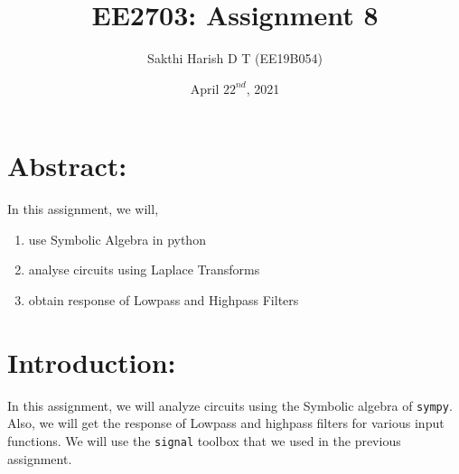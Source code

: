 \documentclass[11pt, a4paper]{article}
\title{EE2703: Assignment 8}
\author{Sakthi Harish D T (EE19B054)}
\date{April $22^{nd}$, 2021}
\begin{document}
\maketitle
\section{Abstract:}
In this assignment, we will,
\begin{enumerate}
    \item use Symbolic Algebra in python
    \item analyse circuits using Laplace Transforms
    \item obtain response of Lowpass and Highpass Filters 
\end{enumerate}
\section{Introduction:}
In this assignment, we will analyze circuits using the Symbolic algebra  of \texttt{sympy}. Also, we will get the response of Lowpass and highpass filters for various input functions. We will use the \texttt{signal} toolbox that we used in the previous assignment.
\end{document}
